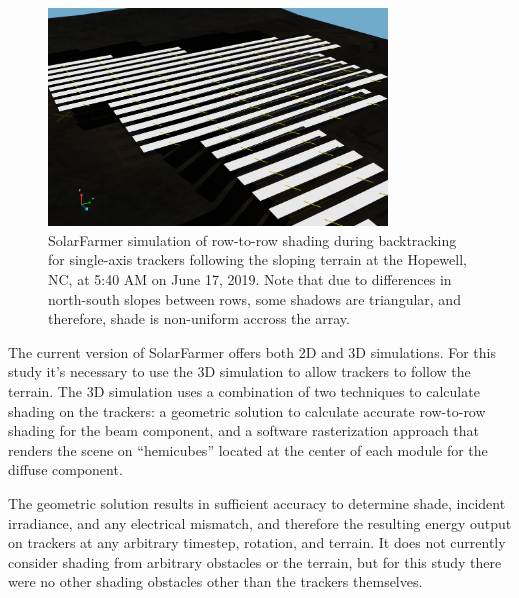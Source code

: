 \documentclass[conference]{IEEEtran}
\begin{document}
\begin{figure}[htbp]
\centerline{\includegraphics[width=9cm]{Hopewell-Friends-SolarFarmer-shade-follows-std.png}}
\caption{SolarFarmer simulation of row-to-row shading during backtracking for single-axis trackers following the sloping terrain at the Hopewell, NC, at 5:40 AM on June 17, 2019. Note that due to differences in north-south slopes between rows, some shadows are triangular, and therefore, shade is non-uniform accross the array.}
\label{terrain-shade}
\end{figure}

The current version of SolarFarmer offers both 2D and 3D simulations. For this study it’s necessary to use the 3D simulation to allow trackers to follow the terrain. The 3D simulation uses a combination of two techniques to calculate shading on the trackers: a geometric solution to calculate accurate row-to-row shading for the beam component, and a software rasterization approach that renders the scene on “hemicubes” located at the center of each module for the diffuse component. 

The geometric solution results in sufficient accuracy to determine shade, incident irradiance, and any electrical mismatch, and therefore the resulting energy output on trackers at any arbitrary timestep, rotation, and terrain. It does not currently consider shading from arbitrary obstacles or the terrain, but for this study there were no other shading obstacles other than the trackers themselves.
\end{document}
